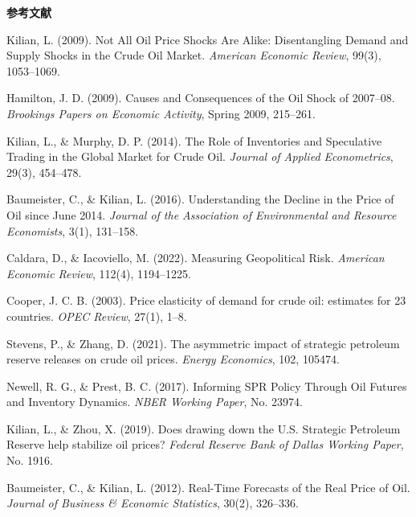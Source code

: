 \begin{center}
{\sffamily\bfseries{} 参考文献}
\end{center}

{\normalfont{}
\begin{enumerate}[label={[\arabic*]},leftmargin=2.2em,itemsep=0.42em,topsep=0.25em]
\item
Kilian, L. (2009). Not All Oil Price Shocks Are Alike: Disentangling Demand and Supply Shocks in the Crude Oil Market. \textit{American Economic Review}, 99(3), 1053--1069.

\item
Hamilton, J. D. (2009). Causes and Consequences of the Oil Shock of 2007--08. \textit{Brookings Papers on Economic Activity}, Spring 2009, 215--261.

\item
Kilian, L., \& Murphy, D. P. (2014). The Role of Inventories and Speculative Trading in the Global Market for Crude Oil. \textit{Journal of Applied Econometrics}, 29(3), 454--478.

\item
Baumeister, C., \& Kilian, L. (2016). Understanding the Decline in the Price of Oil since June 2014. \textit{Journal of the Association of Environmental and Resource Economists}, 3(1), 131--158.

\item
Caldara, D., \& Iacoviello, M. (2022). Measuring Geopolitical Risk. \textit{American Economic Review}, 112(4), 1194--1225.

\item
Cooper, J. C. B. (2003). Price elasticity of demand for crude oil: estimates for 23 countries. \textit{OPEC Review}, 27(1), 1--8.

\item
Stevens, P., \& Zhang, D. (2021). The asymmetric impact of strategic petroleum reserve releases on crude oil prices. \textit{Energy Economics}, 102, 105474.

\item
Newell, R. G., \& Prest, B. C. (2017). Informing SPR Policy Through Oil Futures and Inventory Dynamics. \textit{NBER Working Paper}, No. 23974.

\item
Kilian, L., \& Zhou, X. (2019). Does drawing down the U.S. Strategic Petroleum Reserve help stabilize oil prices? \textit{Federal Reserve Bank of Dallas Working Paper}, No. 1916.

\item
Baumeister, C., \& Kilian, L. (2012). Real-Time Forecasts of the Real Price of Oil. \textit{Journal of Business \& Economic Statistics}, 30(2), 326--336.


\end{enumerate}}

